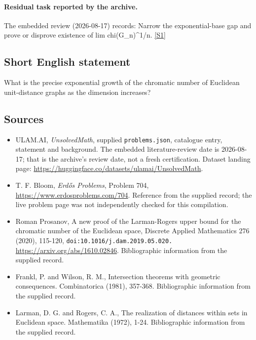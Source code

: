 \documentclass[11pt,a4paper]{article}
\newcommand{\sref}[2]{\hyperlink{source:#1:#2}{[S#2]}}
\begin{document}
\paragraph{Residual task reported by the archive.}

The embedded review (2026-08-17) records: Narrow the exponential-base gap and prove or disprove existence of lim chi(G\_n)\textasciicircum{}{1/n}. \sref{statement}{1}

\subsection{Short English statement}

What is the precise exponential growth of the chromatic number of Euclidean unit-distance graphs as the dimension increases?

\subsection{Sources}

{\small

\begin{itemize}

\item[\hypertarget{source:statement:1}{S1}] ULAM.AI, \emph{UnsolvedMath}, supplied \texttt{problems.json}, catalogue entry, statement and background. The embedded literature-review date is 2026-08-17; that is the archive’s review date, not a fresh certification. Dataset landing page: \url{https://huggingface.co/datasets/ulamai/UnsolvedMath}.

\item[\hypertarget{source:statement:2}{S2}] T. F. Bloom, \emph{Erdős Problems}, Problem 704, \url{https://www.erdosproblems.com/704}. Reference from the supplied record; the live problem page was not independently checked for this compilation.

\item[\hypertarget{source:statement:3}{S3}] Roman Prosanov, A new proof of the Larman-Rogers upper bound for the chromatic number of the Euclidean space, Discrete Applied Mathematics 276 (2020), 115-120, \nolinkurl{doi:10.1016/j.dam.2019.05.020.} \url{https://arxiv.org/abs/1610.02846}. Bibliographic information from the supplied record.

\item[\hypertarget{source:statement:4}{S4}] Frankl, P. and Wilson, R. M., Intersection theorems with geometric consequences. Combinatorica (1981), 357-368. Bibliographic information from the supplied record.

\item[\hypertarget{source:statement:5}{S5}] Larman, D. G. and Rogers, C. A., The realization of distances within sets in Euclidean space. Mathematika (1972), 1-24. Bibliographic information from the supplied record.

\end{itemize}

}

\label{end:statement}
\end{document}
